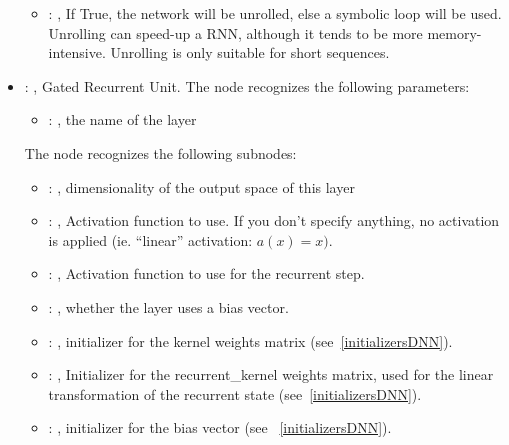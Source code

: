 \begin{itemize}
\begin{itemize}
        \item {}: , 
          If True, the network will be unrolled, else a symbolic loop will be used. Unrolling can
          speed-up a         RNN, although it tends to be more memory-intensive. Unrolling is only
          suitable for short sequences.
      \end{itemize}

    \item {}: , 
      Gated Recurrent Unit.
      The  node recognizes the following parameters:
        \begin{itemize}
          \item {}: , 
            the name of the layer
      \end{itemize}

      The  node recognizes the following subnodes:
      \begin{itemize}
        \item {}: , 
          dimensionality of the output space of this layer

        \item {}: , 
          Activation function to use. If you don't specify anything, no activation is applied (ie.
          ``linear''         activation: $a(x) = x)$.

        \item {}: , 
          Activation function to use for the recurrent step.

        \item {}: , 
          whether the layer uses a bias vector.

        \item {}: , 
          initializer for the kernel weights matrix (see~\ref{initializersDNN}).

        \item {}: , 
          Initializer for the recurrent\_kernel weights matrix, used for the linear transformation
          of the         recurrent state (see~\ref{initializersDNN}).

        \item {}: , 
          initializer for the bias vector (see ~\ref{initializersDNN}).


\end{itemize}
\end{itemize}

